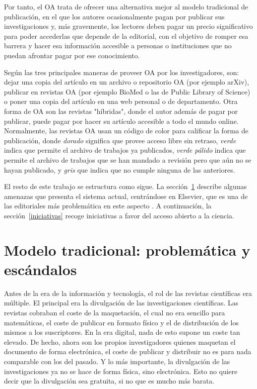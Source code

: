 Por tanto, el OA trata de ofrecer una alternativa mejor al modelo tradicional de publicación, en el que los autores ocasionalmente pagan por publicar sus investigaciones y, más gravemente, los lectores deben pagar un precio significativo para poder accederlas que depende de la editorial, con el objetivo de romper esa barrera y hacer esa información accesible a personas o instituciones que no puedan afrontar pagar por ese conocimiento.

Según \cite{suber2007open} las tres principales maneras de proveer OA por los investigadores, son: dejar una copia del artículo en un archivo o repositorio OA (por ejemplo arXiv), publicar en revistas OA (por ejemplo BioMed o las de Public Library of Science) o poner una copia del artículo en una web personal o de departamento. Otra forma de OA son las revistas "híbridas", donde el autor además de pagar por publicar, puede pagar por hacer su artículo accesible a todo el mundo online. Normalmente, las revistas OA usan un código de color para calificar la forma de publicación, donde \textit{dorado} significa que provee acceso libre sin retraso, \textit{verde} indica que permite el archivo de trabajos ya publicados, \textit{verde pálido} indica que permite el archivo de trabajos que se han mandado a revisión pero que aún no se hayan publicado, y \textit{gris} que indica que no cumple ninguna de las anteriores.

 
El resto de este trabajo se estructura como sigue. La sección~\ref{amenazas} describe algunas amenazas que presenta el sistema actual, centrándose en Elsevier, que es una de las editoriales más problemática en este aspecto \cite{costknowledge}. A continuación, la sección~\ref{iniciativas} recoge iniciativas a favor del acceso abierto a la ciencia.

\section{Modelo tradicional: problemática y escándalos}\label{amenazas}

Antes de la era de la información y tecnología, el rol de las revistas científicas era múltiple. El principal era la divulgación de las investigaciones científicas. Las revistas cobraban el coste de la maquetación, el cual no era sencillo para matemáticas, el coste de publicar en formato físico y el de distribución de los mismos a los suscriptores. En la era digital, nada de esto supone un coste tan elevado. De hecho, ahora son los propios investigadores quienes maquetan el documento de forma electrónica, el coste de publicar y distribuir no es para nada comparable con los del pasado. Y lo más importante, la divulgación de las investigaciones ya no se hace de forma física, sino electrónica. Esto no quiere decir que la divulgación sea gratuita, si no que es mucho más barata.


